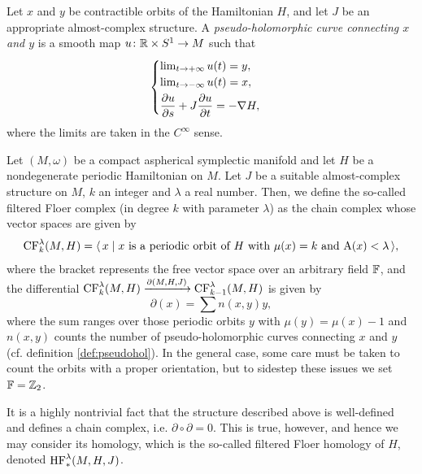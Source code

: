 \begin{itemize}
\begin{definition}\label{def:pseudohol}
Let $x$ and $y$ be contractible orbits of the Hamiltonian $H$, and let $J$ be an appropriate almost-complex structure. A \emph{pseudo-holomorphic curve connecting $x$ and $y$} is a smooth map $u \colon \mathbb{R} \times S^1 \to M$ such that
\begin{equation}
\begin{cases}
\lim_{t \to +\infty} u(t) = y,\\
\lim_{t \to -\infty} u(t) = x,\\[0.1cm]
\displaystyle \diffp u s + J \diffp u t = - \grad H,
\end{cases}
\end{equation}
where the limits are taken in the $C^\infty$ sense.
\end{definition}
\end{itemize}

\begin{definition}
Let $(M,\omega)$ be a compact aspherical symplectic manifold and let $H$ be a nondegenerate periodic Hamiltonian on $M$. Let $J$ be a suitable almost-complex structure on $M$, $k$ an integer and $\lambda$ a real number. Then, we define the so-called filtered Floer complex (in degree $k$ with parameter $\lambda$) as the chain complex whose vector spaces are given by
\begin{equation}
\mathrm{CF}_k^\lambda(M, H) = \langle\, x \mid \text{$x$ is a periodic orbit of $H$ with $\mu(x) = k$ and $\mathrm{A}(x) < \lambda$}\,\rangle,
\end{equation}
where the bracket represents the free vector space over an arbitrary field $\mathbb{F}$, and the differential $\mathrm{CF}_k^\lambda(M,H) \xrightarrow{\partial(M,H,J)} \mathrm{CF}_{k-1}^\lambda(M,H)$ is given by
\begin{equation}
\partial(x) = \sum n(x,y) y,
\end{equation}
where the sum ranges over those periodic orbits $y$ with $\mu(y) = \mu(x) - 1$ and $n(x,y)$ counts the number of pseudo-holomorphic curves connecting $x$ and $y$ (cf. definition \ref{def:pseudohol}). In the general case, some care must be taken to count the orbits with a proper orientation, but to sidestep these issues we set $\mathbb{F} = \mathbb{Z}_2$.

It is a highly nontrivial fact that the structure described above is well-defined and defines a chain complex, i.e. $\partial \circ \partial = 0$. This is true, however, and hence we may consider its homology, which is the so-called filtered Floer homology of $H$, denoted $\mathrm{HF}_*^\lambda(M,H,J)$.
\end{definition}

